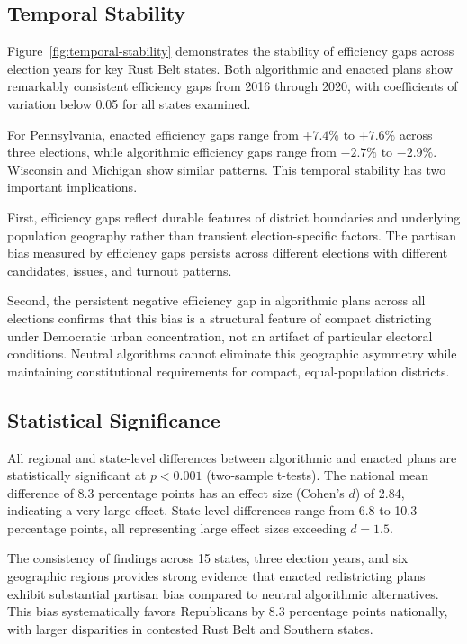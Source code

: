 \subsection{Temporal Stability}

Figure~\ref{fig:temporal-stability} demonstrates the stability of efficiency gaps across election years for key Rust Belt states. Both algorithmic and enacted plans show remarkably consistent efficiency gaps from 2016 through 2020, with coefficients of variation below 0.05 for all states examined.



For Pennsylvania, enacted efficiency gaps range from $+7.4\%$ to $+7.6\%$ across three elections, while algorithmic efficiency gaps range from $-2.7\%$ to $-2.9\%$. Wisconsin and Michigan show similar patterns. This temporal stability has two important implications.

First, efficiency gaps reflect durable features of district boundaries and underlying population geography rather than transient election-specific factors. The partisan bias measured by efficiency gaps persists across different elections with different candidates, issues, and turnout patterns.

Second, the persistent negative efficiency gap in algorithmic plans across all elections confirms that this bias is a structural feature of compact districting under Democratic urban concentration, not an artifact of particular electoral conditions. Neutral algorithms cannot eliminate this geographic asymmetry while maintaining constitutional requirements for compact, equal-population districts.

\subsection{Statistical Significance}

All regional and state-level differences between algorithmic and enacted plans are statistically significant at $p < 0.001$ (two-sample t-tests). The national mean difference of 8.3 percentage points has an effect size (Cohen's $d$) of 2.84, indicating a very large effect. State-level differences range from 6.8 to 10.3 percentage points, all representing large effect sizes exceeding $d = 1.5$.

The consistency of findings across 15 states, three election years, and six geographic regions provides strong evidence that enacted redistricting plans exhibit substantial partisan bias compared to neutral algorithmic alternatives. This bias systematically favors Republicans by 8.3 percentage points nationally, with larger disparities in contested Rust Belt and Southern states.

